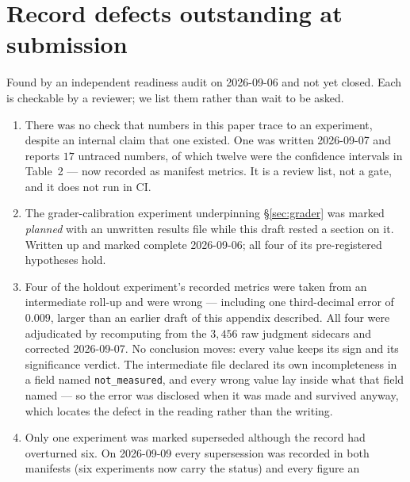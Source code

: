 \documentclass{article}
\newcommand{\expref}[1]{\iftoggle{trace}{\,{\scriptsize\textcolor{gray}{\texttt{[#1]}}}}{}}
\begin{document}



\appendix

\section{Record defects outstanding at submission}

Found by an independent readiness audit on 2026-09-06 and not yet closed. Each is
checkable by a reviewer; we list them rather than wait to be asked.

\begin{enumerate}
\item[\textbf{partly closed}] There was no check that numbers in this paper
      trace to an experiment, despite an internal claim that one existed. One was
      written 2026-09-07 and reports $17$ untraced numbers, of which twelve were
      the confidence intervals in Table~2 --- now recorded as manifest metrics.
      It is a review list, not a gate, and it does not run in CI.
\item[\textbf{closed}] The grader-calibration experiment underpinning
      \S\ref{sec:grader} was marked \emph{planned} with an unwritten results file
      while this draft rested a section on it. Written up and marked complete
      2026-09-06; all four of its pre-registered hypotheses hold.\expref{EXP-2026-09-008}
\item[\textbf{closed}] Four of the holdout experiment's recorded metrics were
      taken from an intermediate roll-up and were wrong --- including one
      third-decimal error of $0.009$, larger than an earlier draft of this
      appendix described. All four were adjudicated by recomputing from the
      $3{,}456$ raw judgment sidecars and corrected 2026-09-07. No conclusion
      moves: every value keeps its sign and its significance
      verdict.\expref{EXP-2026-09-007} The intermediate file declared its own
      incompleteness in a field named \texttt{not\_measured}, and every wrong
      value lay inside what that field named --- so the error was disclosed when
      it was made and survived anyway, which locates the defect in the reading
      rather than the writing.
\item[\textbf{closed}] Only one experiment was marked superseded although the
      record had overturned six. On 2026-09-09 every supersession was recorded in
      both manifests (six experiments now carry the status) and every figure an

\end{enumerate}
\end{document}
